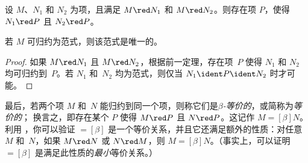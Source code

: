 \documentclass[../../../include/open-logic-section]{subfiles}
\begin{document}

\begin{thm}
设 $M$、$N_1$ 和 $N_2$ 为项，且满足 $M \red N_1$ 和 $M \red
N_2$。则存在项 $P$，使得 $N_1 \red P$ 且 $N_2 \red P$。
\end{thm}

\begin{cor}
若 $M$ 可归约为范式，则该范式是唯一的。
\end{cor}

\begin{proof}
如果 $M \red N_1$ 且 $M \red N_2$，根据前一定理，存在项~$P$ 使得 $N_1$ 和 $N_2$ 均可归约到~$P$。若 $N_1$ 和~$N_2$ 均为范式，则仅当 $N_1 \ident P \ident
N_2$ 时才可能。
\end{proof}

最后，若两个项 $M$ 和~$N$ 能归约到同一个项，则称它们是\emph{$\beta$-等价的}，或简称为\emph{等价的}；
换言之，即存在某个 $P$ 使得 $M
\red P$ 且 $N \red P$。这记作 $M \equal[\beta] N$。利用
，你可以验证 $\equal[\beta]$ 是一个等价关系，并且它还满足额外的性质：对任意 $M$
和~$N$，如果 $M \red N$ 或 $N \red M$，则 $M \equal[\beta] N$。（事实上，可以证明 $\equal[\beta]$ 是满足此性质的\emph{最小}等价关系。）
\end{document}
